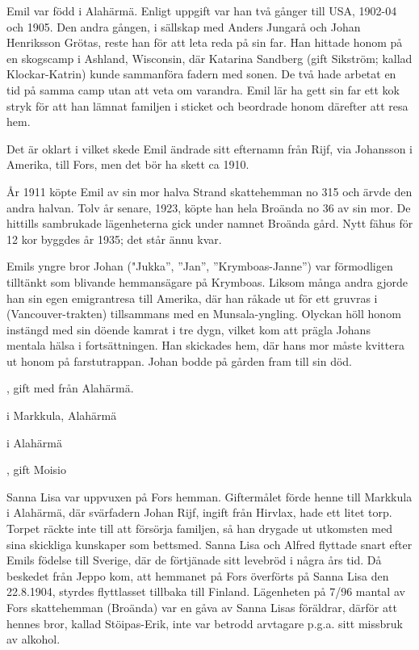 Emil var född i Alahärmä. Enligt uppgift var han två gånger till USA, 1902-04 och 1905. Den andra gången, i sällskap med Anders Jungarå och Johan Henriksson Grötas, reste han för att leta reda på sin far. Han hittade honom på en skogscamp i Ashland, Wisconsin, där Katarina Sandberg (gift Sikström; kallad Klockar-Katrin) kunde sammanföra fadern med sonen. De två hade arbetat en tid på samma camp utan att veta om varandra. Emil lär ha gett sin far ett kok stryk för att han lämnat familjen i sticket och beordrade honom därefter att resa hem.

Det är oklart i vilket skede Emil ändrade sitt efternamn från Rijf, via Johansson i Amerika, till Fors, men det bör ha skett ca 1910.

År 1911 köpte Emil av sin mor halva Strand skattehemman no 315 och ärvde den andra halvan. Tolv år senare, 1923, köpte han hela Broända no 36 av sin mor. De hittills sambrukade lägenheterna gick under namnet Broända gård. Nytt fähus för 12 kor byggdes år 1935; det står ännu kvar.

Emils yngre bror Johan ("Jukka”, ”Jan”, ”Krymboas-Janne”) var förmodligen tilltänkt som blivande hemmansägare på Krymboas. Liksom många andra gjorde han sin egen emigrantresa till Amerika, där han råkade ut för ett gruvras i (Vancouver-trakten) tillsammans med en Munsala-yngling. Olyckan höll honom instängd med sin döende kamrat i tre dygn, vilket kom att prägla Johans mentala hälsa i fortsättningen. Han skickades hem, där hans mor måste kvittera ut honom på farstutrappan. Johan bodde på gården fram till sin död.



 , gift med  från Alahärmä.
\begin{jhchildren}
  \item {} i Markkula, Alahärmä
  \item {} i Alahärmä
  \item {}, gift Moisio
  \item {}
\end{jhchildren}

Sanna Lisa var uppvuxen på Fors hemman. Giftermålet förde henne till Markkula i Alahärmä, där svärfadern Johan Rijf, ingift från Hirvlax, hade ett litet torp. Torpet räckte inte till att försörja familjen, så han drygade ut utkomsten med sina skickliga kunskaper som bettsmed.
Sanna Lisa och Alfred flyttade snart efter Emils födelse till Sverige, där de förtjänade sitt levebröd i några års tid. Då beskedet från Jeppo kom, att hemmanet på Fors överförts på Sanna Lisa den 22.8.1904, styrdes flyttlasset tillbaka till Finland. Lägenheten på 7/96 mantal av Fors skattehemman (Broända) var en gåva av Sanna Lisas föräldrar, därför att hennes bror, kallad Stöipas-Erik, inte var betrodd arvtagare p.g.a. sitt missbruk av alkohol.

